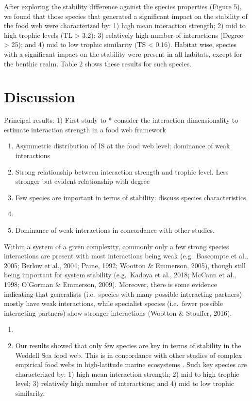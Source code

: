 \documentclass[gc, manuscript]{copernicus}
\providecommand{\tightlist}{%
  \setlength{\itemsep}{0pt}\setlength{\parskip}{0pt}}
\begin{document}
After exploring the stability difference against the species properties
(Figure 5), we found that those species that generated a significant
impact on the stability of the food web were characterized by: 1) high
mean interaction strength; 2) mid to high trophic levels (TL
\textgreater{} 3.2); 3) relatively high number of interactions (Degree
\textgreater{} 25); and 4) mid to low trophic similarity (TS \textless{}
0.16). Habitat wise, species with a significant impact on the stability
were present in all habitats, except for the benthic realm. Table 2
shows these results for such species.

\section{Discussion}

Principal results: 1) First study to * consider the interaction
dimensionality to estimate interaction strength in a food web framework

\begin{enumerate}
\def\labelenumi{\arabic{enumi})}
\setcounter{enumi}{1}
\item
  Asymmetric distribution of IS at the food web level; dominance of weak
  interactions
\item
  Strong relationship between interaction strength and trophic level.
  Less stronger but evident relationship with degree
\item
  Few species are important in terms of stability: discuss species
  characteristics
\item
\item
  Dominance of weak interactions in concordance with other studies.
\end{enumerate}

Within a system of a given complexity, commonly only a few strong
species interactions are present with most interactions being weak
(e.g.~Bascompte et al., 2005; Berlow et al., 2004; Paine, 1992; Wootton
\& Emmerson, 2005), though still being important for system stability
(e.g.~Kadoya et al., 2018; McCann et al., 1998; O'Gorman \& Emmerson,
2009). Moreover, there is some evidence indicating that generalists
(i.e.~species with many possible interacting partners) mostly have weak
interactions, while specialist species (i.e.~fewer possible interacting
partners) show stronger interactions (Wootton \& Stouffer, 2016).

\begin{enumerate}
\def\labelenumi{\arabic{enumi})}
\setcounter{enumi}{2}
\tightlist
\item
\item
  Our results showed that only few species are key in terms of stability
  in the Weddell Sea food web. This is in concordance with other studies
  of complex empirical food webs in high-latitude marine ecosystems
  \citep{Kortsch2015, Marina2018, Rodriguez2022}. Such key species are
  characterized by: 1) high mean interaction strength; 2) mid to high
  trophic level; 3) relatively high number of interactions; and 4) mid
  to low trophic similarity.
\end{enumerate}
\end{document}
